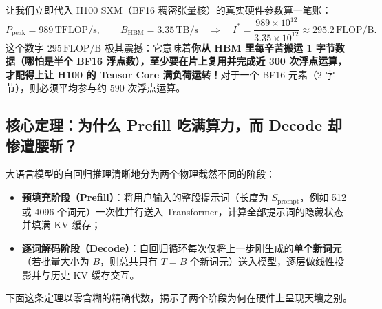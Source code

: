让我们立即代入 H100 SXM（BF16 稠密张量核）的真实硬件参数算一笔账：
\[
  P_{\mathrm{peak}} = 989\,\mathrm{TFLOP/s}, \qquad
  B_{\mathrm{HBM}} = 3.35\,\mathrm{TB/s}
  \quad\Longrightarrow\quad
  I^* = \frac{989 \times 10^{12}}{3.35 \times 10^{12}} \approx 295.2\,\mathrm{FLOP/B}.
\]
这个数字 $295\,\mathrm{FLOP/B}$ 极其震撼：它意味着\textbf{你从 HBM 里每辛苦搬运 1 字节数据（哪怕是半个 BF16 浮点数），至少要在片上复用并完成近 300 次浮点运算，才配得上让 H100 的 Tensor Core 满负荷运转！}对于一个 BF16 元素（2 字节），则必须平均参与约 $590$ 次浮点运算。

\subsection{核心定理：为什么 Prefill 吃满算力，而 Decode 却惨遭腰斩？}

大语言模型的自回归推理清晰地分为两个物理截然不同的阶段：
\begin{itemize}
  \item \textbf{预填充阶段（Prefill）}：将用户输入的整段提示词（长度为 $S_{\mathrm{prompt}}$，例如 512 或 4096 个词元）一次性并行送入 Transformer，计算全部提示词的隐藏状态并填满 KV 缓存；
  \item \textbf{逐词解码阶段（Decode）}：自回归循环每次仅将上一步刚生成的\textbf{单个新词元}（若批量大小为 $B$，则总共只有 $T = B$ 个新词元）送入模型，逐层做线性投影并与历史 KV 缓存交互。
\end{itemize}
下面这条定理以零含糊的精确代数，揭示了两个阶段为何在硬件上呈现天壤之别。

